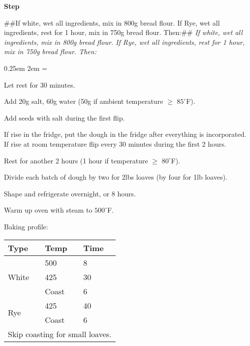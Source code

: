 \documentclass{article}
\newcommand{\tempF}[1]{%
    $#1^\circ$F}
\newcounter{stepnum}
\newenvironment{method}[1][]{%
    \setcounter{stepnum}{0}
    \noindent
    {\color{red}\Large\textbf{Step}}%
    \par
    \smallskip
    \if###1##%
    \else
        \noindent
        \emph{#1}
        \par
    \fi
    \begingroup
    \parindent0pt
    \parskip0.25em
        \leftskip2em
    \everypar={\llap{\stepcounter{stepnum}\hbox to2em{\thestepnum.\hfill}}}
}{%
    \par
    \endgroup}
\begin{document}
\begin{method}[If white, wet all ingredients, mix in 800g bread flour. If Rye, wet all ingredients, rest for 1 hour, mix in 750g bread flour. Then:]
Let rest for 30 minutes.

Add 20g salt, 60g water (50g if ambient temperature $\geq$\tempF{85}).

Add seeds with salt during the first flip.

If rise in the fridge, put the dough in the fridge after everything is incorporated. If rise at room temperature flip every 30 minutes during the first 2 hours.

Rest for another 2 hours (1 hour if temperature $\geq$\tempF {80}).

Divide each batch of dough by two for 2lbs loaves (by four for 1lb loaves).

Shape and refrigerate overnight, or 8 hours.

Warm up oven with steam to \tempF{500}.

Baking profile:
\begin{tabular}{lll}
\hline
\textbf{Type}          & \textbf{Temp} & \textbf{Time}  \\
\hline
\multirow{3}{*}{White} & 500           & 8              \\
                       & 425           & 30             \\
                       & Coast         & 6              \\
\hline
\multirow{2}{*}{Rye}   & 425           & 40             \\
                       & Coast         & 6              \\
\hline
\multicolumn{3}{l}{Skip coasting for small loaves.}
\end{tabular}



\end{method}
\end{document}
